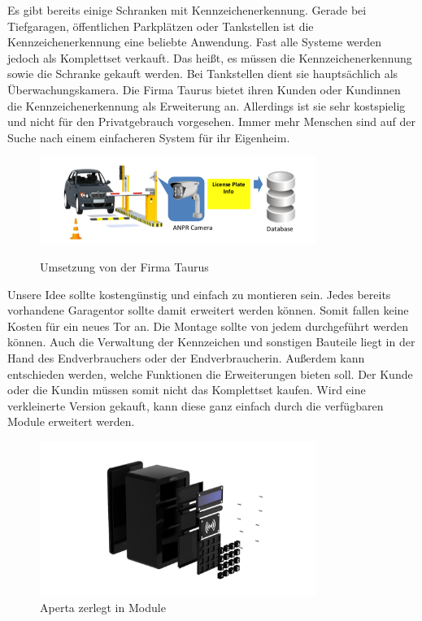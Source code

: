 Es gibt bereits einige Schranken mit Kennzeichenerkennung. Gerade bei Tiefgaragen, öffentlichen Parkplätzen oder Tankstellen ist die Kennzeichenerkennung eine beliebte Anwendung. Fast alle Systeme werden jedoch als Komplettset verkauft. Das heißt, es müssen die Kennzeichenerkennung sowie die Schranke gekauft werden. Bei Tankstellen dient sie hauptsächlich als Überwachungskamera.
Die Firma Taurus bietet ihren Kunden oder Kundinnen die Kennzeichenerkennung als Erweiterung an. Allerdings ist sie sehr kostspielig und nicht für den Privatgebrauch vorgesehen. Immer mehr Menschen sind auf der Suche nach einem einfacheren System für ihr Eigenheim.

\begin{figure}[H]
    \centering
    \includegraphics[width=0.8\textwidth]{pics/Taurus_Umsetzung.png}
    \caption{Umsetzung von der Firma Taurus}
    \cite{TaurusUmsetzung}
  \end{figure}

  Unsere Idee sollte kostengünstig und einfach zu montieren sein. Jedes bereits vorhandene Garagentor sollte damit erweitert werden können. Somit fallen keine Kosten für ein neues Tor an. Die Montage sollte von jedem durchgeführt werden können. Auch die Verwaltung der Kennzeichen und sonstigen Bauteile liegt in der Hand des Endverbrauchers oder der Endverbraucherin. Außerdem kann entschieden werden, welche Funktionen die Erweiterungen bieten soll. Der Kunde oder die Kundin müssen somit nicht das Komplettset kaufen. Wird eine verkleinerte Version gekauft, kann diese ganz einfach durch die verfügbaren Module erweitert werden.

  \begin{figure}[H]
    \centering
    \includegraphics[width=0.8\textwidth]{pics/Modular_Aperta.png}
    \caption{Aperta zerlegt in Module}
  \end{figure}